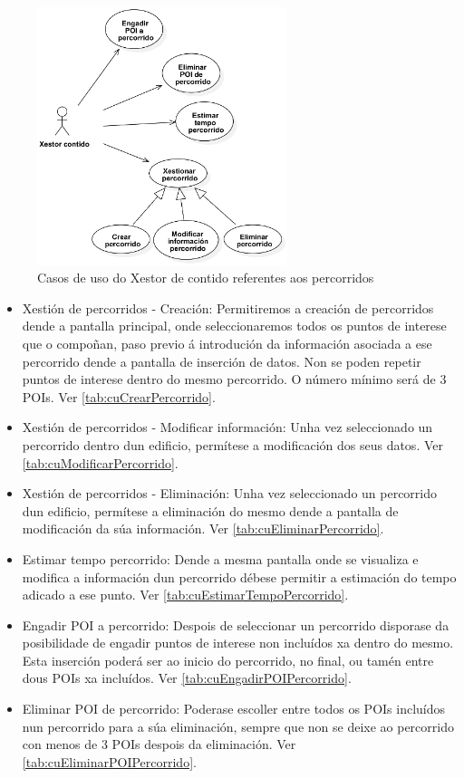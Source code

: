 \begin{figure}[tbp]
	\begin{center}
		\includegraphics[width=0.65\textwidth]{figures/CasosUso/XestorContidoPercorrido}
		\caption{Casos de uso do Xestor de contido referentes aos percorridos}
		\label{fig:cuXestorContidoPercorrido}
	\end{center}
\end{figure}

\begin{itemize}
	\item Xestión de percorridos - Creación: Permitiremos a creación de percorridos dende a pantalla principal, onde seleccionaremos todos os puntos de interese que o compoñan, paso previo á introdución da información asociada a ese percorrido dende a pantalla de inserción de datos. Non se poden repetir puntos de interese dentro do mesmo percorrido. O número mínimo será de 3 POIs. Ver \ref{tab:cuCrearPercorrido}.
	\item Xestión de percorridos - Modificar información: Unha vez seleccionado un percorrido dentro dun edificio, permítese a modificación dos seus datos. Ver \ref{tab:cuModificarPercorrido}.
	\item Xestión de percorridos - Eliminación: Unha vez seleccionado un percorrido dun edificio, permítese a eliminación do mesmo dende a pantalla de modificación da súa información. Ver \ref{tab:cuEliminarPercorrido}.
	\item Estimar tempo percorrido: Dende a mesma pantalla onde se visualiza e modifica a información dun percorrido débese permitir a estimación do tempo adicado a ese punto. Ver \ref{tab:cuEstimarTempoPercorrido}.
	\item Engadir POI a percorrido: Despois de seleccionar un percorrido disporase da posibilidade de engadir puntos de interese non incluídos xa dentro do mesmo. Esta inserción poderá ser ao inicio do percorrido, no final, ou tamén entre dous POIs xa incluídos. Ver \ref{tab:cuEngadirPOIPercorrido}.
	\item Eliminar POI de percorrido: Poderase escoller entre todos os POIs incluídos nun percorrido para a súa eliminación, sempre que non se deixe ao percorrido con menos de 3 POIs despois da eliminación. Ver \ref{tab:cuEliminarPOIPercorrido}.
\end{itemize}


